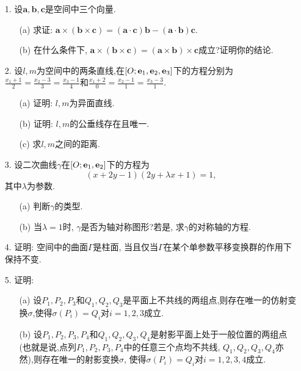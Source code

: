 \begin{itemize}
    \item[1.] 设$\mathbf{a},\mathbf{b},\mathbf{c}$是空间中三个向量.
    \begin{itemize}
        \item[(a)] 求证: $\mathbf{a}\times (\mathbf{b}\times\mathbf{c})=(\mathbf{a}\cdot\mathbf{c})\mathbf{b}-(\mathbf{a}\cdot\mathbf{b})\mathbf{c}$.
        \item[(b)] 在什么条件下, $\mathbf{a}\times (\mathbf{b}\times\mathbf{c})=(\mathbf{a}\times \mathbf{b})\times\mathbf{c}$成立?证明你的结论.
    \end{itemize}
    \item[2.] 设$l,m$为空间中的两条直线,在$[O;\mathbf{e}_1,\mathbf{e}_2,\mathbf{e}_3]$下的方程分别为
    $\frac{x_1+1}{2}=\frac{x_2-3}{3}=\frac{x_3-1}{4}$和$\frac{x_1+2}{0}=\frac{x_2-1}{1}=\frac{x_3-3}{1}$.
    \begin{itemize}
        \item[(a)] 证明: $l,m$为异面直线.
        \item[(b)] 证明: $l,m$的公垂线存在且唯一.
        \item[(c)] 求$l,m$之间的距离.
    \end{itemize}
    \item[3.] 设二次曲线$\gamma$在$[O;\mathbf{e}_1,\mathbf{e}_2]$下的方程为\[(x+2y-1)(2y+\lambda x+1)=1,\] 
    其中$\lambda$为参数.
    \begin{itemize}
        \item[(a)] 判断$\gamma$的类型.
        \item[(b)] 当$\lambda=1$时, $\gamma$是否为轴对称图形?若是, 求$\gamma$的对称轴的方程.
    \end{itemize}
    \item[4.] 证明: 空间中的曲面$\Gamma$是柱面, 当且仅当$\Gamma$在某个单参数平移变换群的作用下保持不变.
    \item[5.] 证明:
    \begin{itemize}
        \item[(a)]设$P_1,P_2,P_3$和$Q_1,Q_2,Q_3$是平面上不共线的两组点,则存在唯一的仿射变换$\sigma$,使得$\sigma(P_i)=Q_i$对$i=1,2,3$成立.
        \item[(b)]设$P_1,P_2,P_3,P_4$和$Q_1,Q_2,Q_3,Q_4$是射影平面上处于一般位置的两组点
        (也就是说,点列$P_1,P_2,P_3,P_4$中的任意三个点均不共线, $Q_1,Q_2,Q_3,Q_4$亦然),则存在唯一的射影变换$\sigma$, 使得$\sigma(P_i)=Q_i$对$i=1,2,3,4$成立.
    \end{itemize}
\end{itemize}

